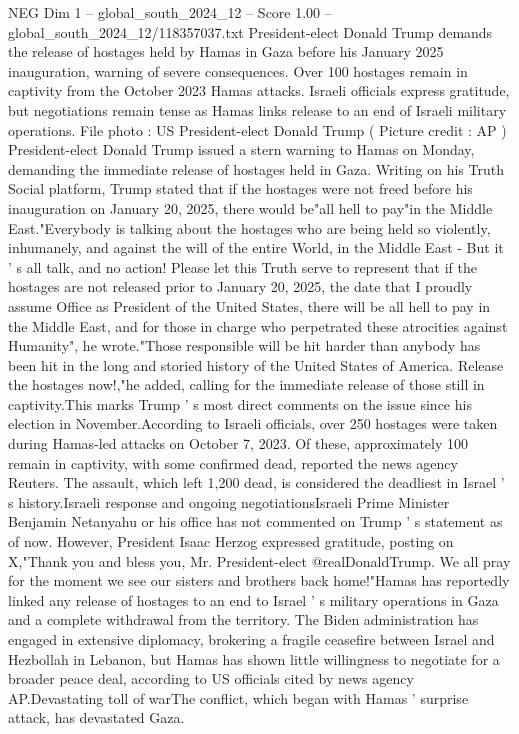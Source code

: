 \begin{textsample}{NEG Dim 1 – global\_south\_2024\_12 – Score 1.00 – global\_south\_2024\_12/118357037.txt}  \label{ex:f1_neg_259}
President-elect Donald Trump demands the release of hostages held by Hamas in Gaza before his January 2025 inauguration, warning of severe consequences.
Over 100 hostages remain in captivity from the October 2023 Hamas attacks.
Israeli officials express gratitude, but negotiations remain tense as Hamas links release to an end of Israeli military operations.
File photo : US President-elect Donald Trump ( Picture credit : AP ) President-elect Donald Trump issued a stern warning to Hamas on Monday, demanding the immediate release of hostages held in Gaza.
Writing on his Truth Social platform, Trump stated that if the hostages were not freed before his inauguration on January 20, 2025, there would be"all hell to pay"in the Middle East."Everybody is talking about the hostages who are being held so violently, inhumanely, and against the will of the entire World, in the Middle East - But it ' s all talk, and no action!
Please let this Truth serve to represent that if the hostages are not released prior to January 20, 2025, the date that I proudly assume Office as President of the United States, there will be all hell to pay in the Middle East, and for those in charge who perpetrated these atrocities against Humanity", he wrote."Those responsible will be hit harder than anybody has been hit in the long and storied history of the United States of America.
Release the hostages now!,"he added, calling for the immediate release of those still in captivity.This marks Trump ' s most direct comments on the issue since his election in November.According to Israeli officials, over 250 hostages were taken during Hamas-led attacks on October 7, 2023.
Of these, approximately 100 remain in captivity, with some confirmed dead, reported the news agency Reuters.
The assault, which left 1,200 dead, is considered the deadliest in Israel ' s history.Israeli response and ongoing negotiationsIsraeli Prime Minister Benjamin Netanyahu or his office has not commented on Trump ' s statement as of now.
However, President Isaac Herzog expressed gratitude, posting on X,"Thank you and bless you, Mr.
President-elect @realDonaldTrump.
We all pray for the moment we see our sisters and brothers back home!"Hamas has reportedly linked any release of hostages to an end to Israel ' s military operations in Gaza and a complete withdrawal from the territory.
The Biden administration has engaged in extensive diplomacy, brokering a fragile ceasefire between Israel and Hezbollah in Lebanon, but Hamas has shown little willingness to negotiate for a broader peace deal, according to US officials cited by news agency AP.Devastating toll of warThe conflict, which began with Hamas ' surprise attack, has devastated Gaza.

\end{textsample}
